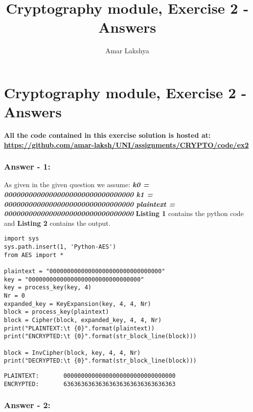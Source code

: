 \documentclass[10pt,a4paper,oneside]{article}
\author{Amar Lakshya}
\title{Cryptography module, Exercise 2 - Answers}
\begin{document}
\part*{Cryptography module, Exercise 2 - Answers}

\textbf{All the code contained in this exercise solution is hosted at:\linebreak
\href{https://github.com/amar-laksh/UNI/tree/master/assignments/CRYPTO/code/ex2}
{https://github.com/amar-laksh/UNI/assignments/CRYPTO/code/ex2}}
\section*{Answer - 1:}

As given in the given question we assume:\newline
\textit{
\textbf{
k0 = 00000000000000000000000000000000\newline
k1 = 00000000000000000000000000000000\newline
plaintext = 00000000000000000000000000000000\newline
}
}
\newline
\textbf{Listing 1} contains the python code and \textbf{Listing 2} contains the output.

\lstset{showstringspaces=false}
\begin{lstlisting}
import sys
sys.path.insert(1, 'Python-AES')
from AES import *

plaintext = "00000000000000000000000000000000"
key = "00000000000000000000000000000000"
key = process_key(key, 4)
Nr = 0
expanded_key = KeyExpansion(key, 4, 4, Nr)
block = process_key(plaintext)
block = Cipher(block, expanded_key, 4, 4, Nr)
print("PLAINTEXT:\t {0}".format(plaintext))
print("ENCRYPTED:\t {0}".format(str_block_line(block)))

block = InvCipher(block, key, 4, 4, Nr)
print("DECRYPTED:\t {0}".format(str_block_line(block)))
\end{lstlisting}

\begin{lstlisting}
PLAINTEXT:       00000000000000000000000000000000
ENCRYPTED:       63636363636363636363636363636363
\end{lstlisting}

\section*{Answer - 2:}
\end{document}
